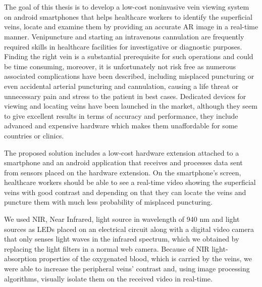 \chapter{\abstractname}
 


The goal of this thesis is to develop a low-cost noninvasive vein viewing system on android smartphones that helps healthcare workers to identify the superficial veins, locate and examine them by providing an accurate AR image in a real-time manner. 
Venipuncture and starting an intravenous cannulation are frequently required skills in healthcare facilities for investigative or diagnostic purposes. Finding the right vein is a substantial prerequisite for such operations and could be time consuming, moreover, it is unfortunately not risk free as numerous associated complications have been described, including misplaced puncturing or even accidental arterial puncturing and cannulation, causing a life threat or unnecessary pain and stress to the patient in best cases.  
Dedicated devices for viewing and locating veins have been launched in the market, although they seem to give excellent results in terms of accuracy and performance, they include advanced and expensive hardware which makes them unaffordable for some countries or clinics.  

The proposed solution includes a low-cost hardware extension attached to a smartphone and an android application that receives and processes data sent from sensors placed on the hardware extension. On the smartphone’s screen, healthcare workers should be able to see a real-time video showing the superficial veins with good contrast and depending on that they can locate the veins and puncture them with much less probability of misplaced puncturing. 

We used NIR, Near Infrared, light source in wavelength of 940 nm and light sources as LEDs placed on an electrical circuit along with a digital video camera that only senses light waves in the infrared spectrum, which we obtained by replacing the light filters in a normal web camera. Because of NIR light-absorption properties of the oxygenated blood, which is carried by the veins, we were able to increase the peripheral veins’ contrast and, using image processing algorithms, visually isolate them on the received video in real-time.


